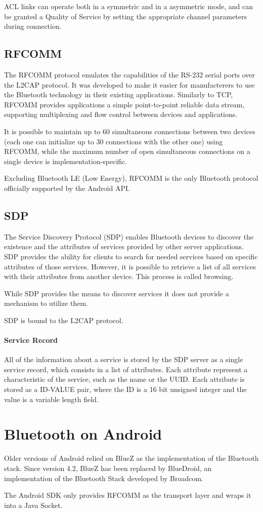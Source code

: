 ACL links can operate both in a symmetric and in a asymmetric mode, and can be granted a Quality of Service by setting the appropriate channel parameters during connection.

\subsection{RFCOMM}
The RFCOMM protocol emulates the capabilities of the RS-232 serial ports over the L2CAP protocol. It was developed to make it easier for manufacterers to use the Bluetooth technology in their existing applications. Similarly to TCP, RFCOMM provides applications a simple point-to-point reliable data stream, supporting multiplexing and flow control between devices and applications.

It is possible to maintain up to 60 simultaneous connections between two devices (each one can initialize up to 30 connections with the other one) using RFCOMM, while the maximum number of open simultaneous connections on a single device is implementation-specific.

Excluding Bluetooth LE (Low Energy), RFCOMM is the only Bluetooth protocol officially supported by the Android API.

\subsection{SDP}
The Service Discovery Protocol (SDP) enables Bluetooth devices to discover the existence and the attributes of services provided by other server applications.
SDP provides the ability for clients to search for needed services based on specific attributes of those services. 
However, it is possible to retrieve a list of all services with their attributes from another device.
This process is called browsing.

While SDP provides the means to discover services it does not provide a mechanism to utilize them.

SDP is bound to the L2CAP protocol.

\paragraph{Service Record}
All of the information about a service is stored by the SDP server as a single service record, which consists in a list of attributes.
Each attribute represent a characteristic of the service, such as the name or the UUID. Each attribute is stored as a ID-VALUE pair, where the ID is a 16 bit unsigned integer and the value is a variable length field.


\section{Bluetooth on Android}
Older versions of Android relied on BlueZ as the implementation of the Bluetooth stack.
Since version 4.2, BlueZ has been replaced by BlueDroid, an implementation of the Bluetooth Stack developed by Broadcom. 

The Android SDK only provides RFCOMM as the transport layer and wraps it into a Java Socket.